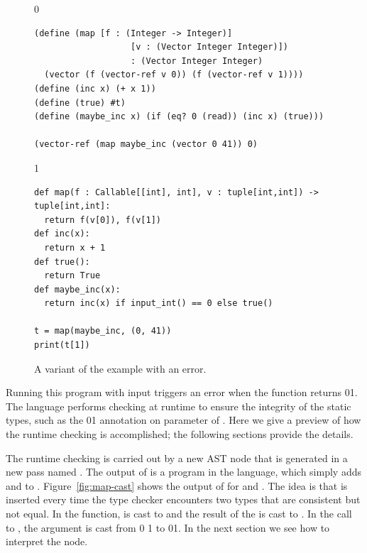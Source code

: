 \documentclass[7x10]{TimesAPriori_MIT}%
\def\racketEd{0}
\def\pythonEd{1}
\def\edition{1}
\newcommand{\racket}[1]{{\if\edition\racketEd{#1}\fi}}
\newcommand{\pythonColor}[0]{}
\newcommand{\python}[1]{{\if\edition\pythonEd\pythonColor #1\fi}}
\numberwithin{theorem}{chapter}
\numberwithin{definition}{chapter}
\numberwithin{equation}{chapter}
\begin{document}
\begin{figure}[tbp]
\begin{tcolorbox}[colback=white]  
{\if\edition\racketEd    
\begin{lstlisting}
(define (map [f : (Integer -> Integer)]
                   [v : (Vector Integer Integer)])
                   : (Vector Integer Integer)
  (vector (f (vector-ref v 0)) (f (vector-ref v 1))))
(define (inc x) (+ x 1))
(define (true) #t)
(define (maybe_inc x) (if (eq? 0 (read)) (inc x) (true)))

(vector-ref (map maybe_inc (vector 0 41)) 0)
\end{lstlisting}
\fi}
{\if\edition\pythonEd\pythonColor    
\begin{lstlisting}
def map(f : Callable[[int], int], v : tuple[int,int]) -> tuple[int,int]:
  return f(v[0]), f(v[1])
def inc(x):
  return x + 1
def true():
  return True
def maybe_inc(x):
  return inc(x) if input_int() == 0 else true()

t = map(maybe_inc, (0, 41))
print(t[1])
\end{lstlisting}
\fi}
\vspace{-5pt}
\end{tcolorbox}

\caption{A variant of the  example with an error.}
\label{fig:map-maybe_inc}
\end{figure}

Running this program with input  triggers an
error when the  function returns
\racket{}\python{}.  The \LangGrad{} language
performs checking at runtime to ensure the integrity of the static
types, such as the
\racket{}\python{}
annotation on
parameter  of .
Here we give a preview of how the runtime checking is accomplished;
the following sections provide the details.

The runtime checking is carried out by a new  AST node that
is generated in a new pass named .  The output of
 is a program in the \LangCast{} language, which
simply adds  and \CANYTY{} to \LangLam{}.
%
Figure~\ref{fig:map-cast} shows the output of  for
 and .  The idea is that  is
inserted every time the type checker encounters two types that are
consistent but not equal. In the  function,  is
cast to \INTTY{} and the result of the \code{+} is cast to
\CANYTY{}.  In the call to , the  argument
is cast from
\racket{}
\python{}
to 
\racket{}\python{}.
%
In the next section we see how to interpret the  node.
\end{document}
